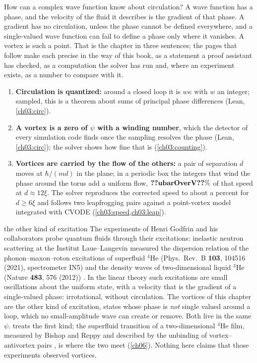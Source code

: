 How can a complex wave function know about circulation? A wave function has a phase, and the velocity of the fluid it describes is the gradient of that phase. A gradient has no circulation, unless the phase cannot be defined everywhere, and a single-valued wave function can fail to define a phase only where it vanishes. A vortex is such a point. That is the chapter in three sentences; the pages that follow make each precise in the way of this book, as a statement a proof assistant has checked, as a computation the solver has run and, where an experiment exists, as a number to compare with it.

\begin{keybox}
\begin{enumerate}
\item \textbf{Circulation is quantized:} around a closed loop it is $w\kappa$ with $w$ an integer; sampled, this is a theorem about sums of principal phase differences (Lean, \cref{ch03:circ}).
\item \textbf{A vortex is a zero of $\psi$ with a winding number}, which the detector of every simulation code finds once the sampling resolves the phase (Lean, \cref{ch03:circ}); the solver shows how fine that is (\cref{ch03:counting}).
\item \textbf{Vortices are carried by the flow of the others:} a pair of separation $d$ moves at $\hbar/(md)$ in the plane; in a periodic box the integers that wind the phase around the torus add a uniform flow, $\cthreeNum{ubarOverV}\%$ of that speed at $d\approx12\xi$. The solver reproduces the corrected speed to about a percent for $d\ge6\xi$ and follows two leapfrogging pairs against a point-vortex model integrated with CVODE (\cref{ch03:speed,ch03:leap}).
\end{enumerate}
\end{keybox}

\begin{godfrinbox}{the other kind of excitation}
The experiments of Henri Godfrin and his collaborators probe quantum fluids through their excitations: inelastic neutron scattering at the Institut Laue--Langevin measured the dispersion relation of the phonon--maxon--roton excitations of superfluid $^4$He (Phys.\ Rev.\ B \textbf{103}, 104516 (2021), spectrometer IN5) \cite{Godfrin2021} and the density waves of two-dimensional liquid $^3$He (Nature \textbf{483}, 576 (2012)) \cite{Godfrin2012}.
In the linear theory such excitations are small oscillations about the uniform state, with a velocity that is the gradient of a single-valued phase: irrotational, without circulation. The vortices of this chapter are the other kind of excitation, states whose phase is \emph{not} single valued around a loop, which no small-amplitude wave can create or remove. Both live in the same $\psi$.  treats the first kind; the superfluid transition of a two-dimensional $^4$He film, measured by Bishop and Reppy \cite{BishopReppy1978} and described by the unbinding of vortex--antivortex pairs \cite{KosterlitzThouless1973}, is where the two meet (\cref{ch06}). Nothing here claims that those experiments observed vortices.
\end{godfrinbox}

